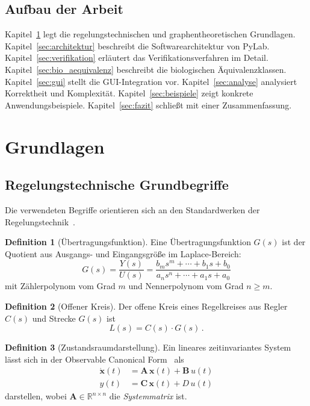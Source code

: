 \documentclass[a4paper,12pt]{article}
\theoremstyle{definition}
\newtheorem{definition}{Definition}
\begin{document}
\subsection{Aufbau der Arbeit}

Kapitel~\ref{sec:grundlagen} legt die regelungstechnischen und graphentheoretischen
Grundlagen. Kapitel~\ref{sec:architektur} beschreibt die Softwarearchitektur von
PyLab. Kapitel~\ref{sec:verifikation} erläutert das Verifikationsverfahren im Detail. Kapitel~\ref{sec:bio_aequivalenz} beschreibt die biologischen Äquivalenzklassen. Kapitel~\ref{sec:gui} stellt die GUI-Integration vor. Kapitel~\ref{sec:analyse}
analysiert Korrektheit und Komplexität. Kapitel~\ref{sec:beispiele} zeigt konkrete
Anwendungsbeispiele. Kapitel~\ref{sec:fazit} schließt mit einer Zusammenfassung.

\section{Grundlagen}
\label{sec:grundlagen}

\subsection{Regelungstechnische Grundbegriffe}

Die verwendeten Begriffe orientieren sich an den Standardwerken der
Regelungstechnik~\cite{ogata,lunze,foellinger,astrom}.

\begin{definition}[Übertragungsfunktion]
Eine Übertragungsfunktion $G(s)$ ist der Quotient aus Ausgangs- und Eingangsgröße
im Laplace-Bereich:
\[
G(s) = \frac{Y(s)}{U(s)} = \frac{b_m s^m + \cdots + b_1 s + b_0}
                                 {a_n s^n + \cdots + a_1 s + a_0}
\]
mit Zählerpoly\-nom vom Grad $m$ und Nennerpolynom vom Grad $n \geq m$.
\end{definition}

\begin{definition}[Offener Kreis]
Der offene Kreis eines Regelkreises aus Regler $C(s)$ und Strecke $G(s)$ ist
\[
L(s) = C(s) \cdot G(s) \,.
\]
\end{definition}

\begin{definition}[Zustandsraumdarstellung]
Ein lineares zeitinvariantes System lässt sich in der Observable Canonical Form~\cite{ogata,foellinger}
als
\begin{align*}
\dot{\mathbf{x}}(t) &= \mathbf{A}\,\mathbf{x}(t) + \mathbf{B}\,u(t) \\
y(t)                &= \mathbf{C}\,\mathbf{x}(t) + D\,u(t)
\end{align*}
darstellen, wobei $\mathbf{A} \in \mathbb{R}^{n \times n}$ die \emph{Systemmatrix} ist.
\end{definition}
\end{document}
